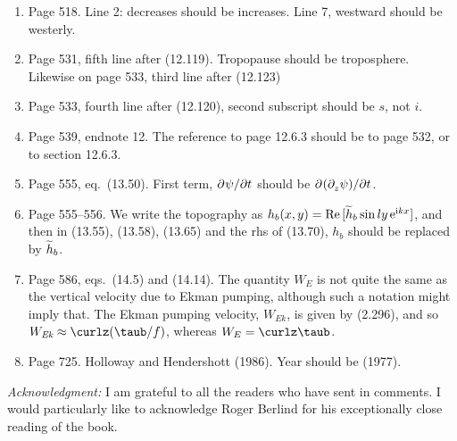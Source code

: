 \documentclass[10pt]{article}
\newcommand{\eq}{eq.\ } \newcommand{\Eq}{Eq.\ }
\begin{document}
\begin{enumerate}
\item Page 518. Line 2: decreases should be increases. Line 7, westward should be westerly.

\item Page 531, fifth line after (12.119). Tropopause should be troposphere. Likewise on page 533, third line after (12.123)

\item Page 533, fourth line after (12.120), second subscript should be $s$, not $i$.

\item Page 539, endnote 12. The reference to page 12.6.3 should be to page 532, or to section 12.6.3.

\item Page 555, \eq (13.50). First term, ${\partial^{} \psi / \partial t^{}}$ should be ${\partial^{}  ({\partial^{}_{z} \psi }) / \partial t^{}}$.

 \item Page 555--556. We write the topography as $h_b(x,y)= \text{Re}\, [ \widetilde{h}_b \sin ly \, \mathrm{e}^{\mathrm{i} kx} ]$, and then in (13.55), (13.58), (13.65) and the rhs of (13.70), $h_b$ should be replaced by $\widetilde h_b$.

 \item Page 586, eqs.\ (14.5) and (14.14). The quantity $W_E$ is not quite the same as the vertical velocity due to Ekman pumping, although such a notation might imply that. The Ekman pumping velocity, $W_{\textit{Ek}}$, is given by (2.296), and so $W_{\textit{Ek}} \approx \curlz (\taub/f)$, whereas $W_E = \curlz \taub$.

 \item Page 725. Holloway and Hendershott (1986). Year should be (1977).

\end{enumerate}

\noindent \textit{Acknowledgment:} I am grateful to all the readers who have sent in comments. I would particularly like to acknowledge Roger Berlind for his exceptionally close reading of the book.
\end{document}
